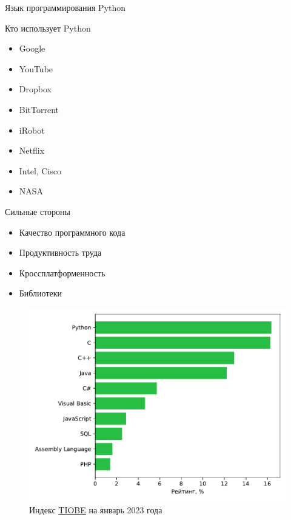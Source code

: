 \documentclass[aspectratio=169, mathserif]{beamer}	%
\begin{document}
\begin{frame}[fragile]{Язык программирования Python}
\scriptsize
\begin{minipage}{.39\textwidth}
\begin{alertblock}{Кто использует Python}
\begin{itemize}
	\item Google
	\item YouTube
	\item Dropbox
	\item BitTorrent
	\item iRobot
	\item Netflix
	\item Intel, Cisco
	\item NASA
\end{itemize}
\end{alertblock}
\begin{alertblock}{Сильные стороны}
\begin{itemize}
	\item Качество программного кода
	\item Продуктивность труда
	\item Кроссплатформенность
	\item Библиотеки
\end{itemize}
\end{alertblock}
\end{minipage}
\begin{minipage}{.6\textwidth}
\begin{figure}[h!]
	\includegraphics[width=\linewidth]{./pics/tiobe}
	\caption{Индекс \href{https://www.tiobe.com/tiobe-index/}{\textcolor{linkcolor}{TIOBE}} на январь 2023 года}
\end{figure}
\end{minipage}
\vfill
\end{frame}
\end{document}
